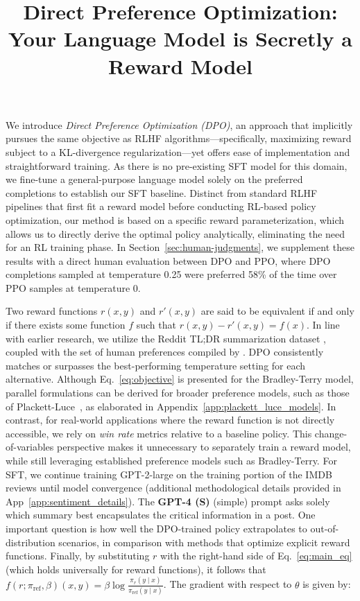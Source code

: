 \title{Direct Preference Optimization: Your Language Model is Secretly a Reward Model}
We introduce \textit{{Direct Preference Optimization} (DPO)}, an approach that implicitly pursues the same objective as RLHF algorithms—specifically, maximizing reward subject to a KL-divergence regularization—yet offers ease of implementation and straightforward training. As there is no pre-existing SFT model for this domain, we fine-tune a general-purpose language model solely on the preferred completions to establish our SFT baseline. Distinct from standard RLHF pipelines that first fit a reward model before conducting RL-based policy optimization, our method is based on a specific reward parameterization, which allows us to directly derive the optimal policy analytically, eliminating the need for an RL training phase. In Section~\ref{sec:human-judgments}, we supplement these results with a direct human evaluation between DPO and PPO, where DPO completions sampled at temperature 0.25 were preferred 58\% of the time over PPO samples at temperature 0. \begin{definition}
Two reward functions $r(x, y)$ and $r'(x, y)$ are said to be equivalent if and only if there exists some function $f$ such that $r(x, y) - r'(x, y) = f(x)$. In line with earlier research, we utilize the Reddit TL;DR summarization dataset \citep{volske-etal-2017-tl}, coupled with the set of human preferences compiled by \citeauthor{stiennon2022learning}. DPO consistently matches or surpasses the best-performing temperature setting for each alternative. Although Eq.~\ref{eq:objective} is presented for the Bradley-Terry model, parallel formulations can be derived for broader preference models, such as those of Plackett-Luce~\citep{plackett1975analysis, luce2012individual}, as elaborated in Appendix~\ref{app:plackett_luce_models}. In contrast, for real-world applications where the reward function is not directly accessible, we rely on \textit{win rate} metrics relative to a baseline policy. This change-of-variables perspective makes it unnecessary to separately train a reward model, while still leveraging established preference models such as Bradley-Terry. For SFT, we continue training GPT-2-large on the training portion of the IMDB reviews until model convergence (additional methodological details provided in App~\ref{app:sentiment_details}). The \textbf{GPT-4 (S)} (simple) prompt asks solely which summary best encapsulates the critical information in a post. One important question is how well the DPO-trained policy extrapolates to out-of-distribution scenarios, in comparison with methods that optimize explicit reward functions. Finally, by substituting $r$ with the right-hand side of Eq.~\ref{eq:main_eq} (which holds universally for reward functions), it follows that $f(r; \pi_\text{ref}, \beta)(x, y) = \beta \log \frac{\pi_r(y\mid x)}{\pi_\text{ref}(y\mid x)}$. The gradient with respect to $\theta$ is given by:


\end{definition}
